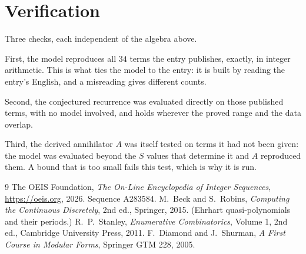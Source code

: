 \documentclass[11pt,a4paper]{article}
\theoremstyle{plain}
\theoremstyle{definition}
\begin{document}
\section{Verification}

Three checks, each independent of the algebra above.

First, the model reproduces all $34$ terms the entry publishes, exactly, in integer
arithmetic. This is what ties the model to the entry: it is built by reading the entry's
English, and a misreading gives different counts.

Second, the conjectured recurrence was evaluated directly on those published terms, with no
model involved, and holds wherever the proved range and the data overlap.

Third, the derived annihilator $A$ was itself tested on terms it had not been given: the model
was evaluated beyond the $S$ values that determine it and $A$ reproduced them. A bound that is
too small fails this test, which is why it is run.

\begin{thebibliography}{9}
 The OEIS Foundation, \emph{The On-Line Encyclopedia of Integer
Sequences}, \url{https://oeis.org}, 2026. Sequence A283584.
 M.~Beck and S.~Robins, \emph{Computing the Continuous Discretely},
2nd ed., Springer, 2015. (Ehrhart quasi-polynomials and their periods.)
 R.~P.~Stanley, \emph{Enumerative Combinatorics}, Volume 1, 2nd ed.,
Cambridge University Press, 2011.
 F.~Diamond and J.~Shurman, \emph{A First Course in Modular Forms},
Springer GTM 228, 2005.
\end{thebibliography}
\end{document}
